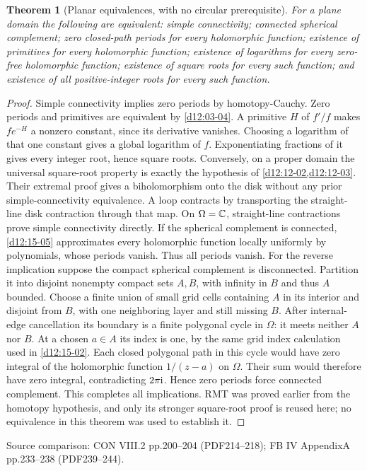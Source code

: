 \documentclass[11pt,a4paper,openany]{book}
\newtheorem{theorem}{Theorem}[chapter]
\theoremstyle{definition}
\theoremstyle{remark}\newtheorem{remark}[theorem]{Remark}
\newcommand{\family}[1]{}
\newcommand{\source}[1]{\par\begingroup\small\sffamily\color{black!65}Source comparison: #1\par\endgroup}
\begin{document}
\begin{theorem}[Planar equivalences, with no circular prerequisite]\family{D12.15.07}\label{d12:15-07}
For a plane domain the following are equivalent: simple connectivity; connected spherical complement; zero closed-path periods for every holomorphic function; existence of primitives for every holomorphic function; existence of logarithms for every zero-free holomorphic function; existence of square roots for every such function; and existence of all positive-integer roots for every such function.
\end{theorem}
\begin{proof}
Simple connectivity implies zero periods by homotopy-Cauchy. Zero periods and primitives are equivalent by \cref{d12:03-04}. A primitive $H$ of $f'/f$ makes $fe^{-H}$ a nonzero constant, since its derivative vanishes. Choosing a logarithm of that one constant gives a global logarithm of $f$. Exponentiating fractions of it gives every integer root, hence square roots. Conversely, on a proper domain the universal square-root property is exactly the hypothesis of \cref{d12:12-02,d12:12-03}. Their extremal proof gives a biholomorphism onto the disk without any prior simple-connectivity equivalence. A loop contracts by transporting the straight-line disk contraction through that map. On $\Omega=\mathbb C$, straight-line contractions prove simple connectivity directly.
If the spherical complement is connected, \cref{d12:15-05} approximates every holomorphic function locally uniformly by polynomials, whose periods vanish. Thus all periods vanish. For the reverse implication suppose the compact spherical complement is disconnected. Partition it into disjoint nonempty compact sets $A,B$, with infinity in $B$ and thus $A$ bounded. Choose a finite union of small grid cells containing $A$ in its interior and disjoint from $B$, with one neighboring layer and still missing $B$. After internal-edge cancellation its boundary is a finite polygonal cycle in $\Omega$: it meets neither $A$ nor $B$. At a chosen $a\in A$ its index is one, by the same grid index calculation used in \cref{d12:15-02}. Each closed polygonal path in this cycle would have zero integral of the holomorphic function $1/(z-a)$ on $\Omega$. Their sum would therefore have zero integral, contradicting $2\pi\mathrm i$. Hence zero periods force connected complement. This completes all implications. RMT was proved earlier from the homotopy hypothesis, and only its stronger square-root proof is reused here; no equivalence in this theorem was used to establish it.
\end{proof}
\source{CON VIII.2 pp.200--204 (PDF214--218); FB IV AppendixA pp.233--238 (PDF239--244).}
\end{document}
